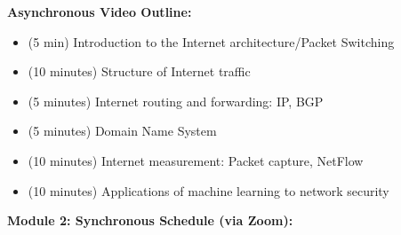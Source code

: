 \documentclass[12pt]{article}
\renewcommand{\_}{\kern-1.5pt\textunderscore\kern-1.5pt}
\begin{document}
\textbf{Asynchronous Video Outline:}\par

\begin{itemize}
	\item (5 min) Introduction to the Internet architecture/Packet Switching\par

	\item (10 minutes) Structure of Internet traffic\par

	\item (5 minutes) Internet routing and forwarding: IP, BGP\par

	\item (5 minutes) Domain Name System\par

	\item (10 minutes) Internet measurement: Packet capture, NetFlow\par

	\item (10 minutes) Applications of machine learning to network security\\

\end{itemize}\par

\textbf{Module 2: Synchronous Schedule (via Zoom): }\par


\newpage

\end{document}
